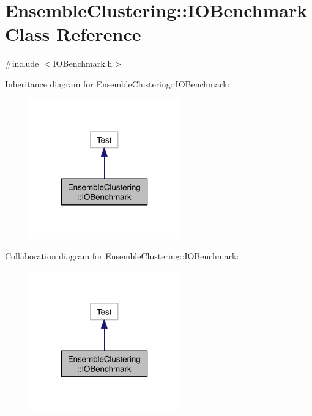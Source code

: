 \hypertarget{class_ensemble_clustering_1_1_i_o_benchmark}{\section{Ensemble\-Clustering\-:\-:I\-O\-Benchmark Class Reference}
\label{class_ensemble_clustering_1_1_i_o_benchmark}
}


{\ttfamily \#include $<$I\-O\-Benchmark.\-h$>$}



Inheritance diagram for Ensemble\-Clustering\-:\-:I\-O\-Benchmark\-:
\nopagebreak
\begin{figure}[H]
\begin{center}
\leavevmode
\includegraphics[width=184pt]{class_ensemble_clustering_1_1_i_o_benchmark__inherit__graph}
\end{center}
\end{figure}


Collaboration diagram for Ensemble\-Clustering\-:\-:I\-O\-Benchmark\-:
\nopagebreak
\begin{figure}[H]
\begin{center}
\leavevmode
\includegraphics[width=184pt]{class_ensemble_clustering_1_1_i_o_benchmark__coll__graph}
\end{center}
\end{figure}
